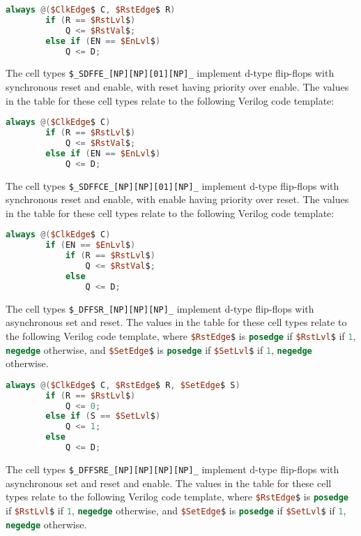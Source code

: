 \begin{lstlisting}[mathescape,language=Verilog]
	always @($ClkEdge$ C, $RstEdge$ R)
		if (R == $RstLvl$)
			Q <= $RstVal$;
		else if (EN == $EnLvl$)
			Q <= D;
\end{lstlisting}

The cell types {\tt \$\_SDFFE\_[NP][NP][01][NP]\_} implement d-type flip-flops
with synchronous reset and enable, with reset having priority over enable.
The values in the table for these cell types relate to the
following Verilog code template:

\begin{lstlisting}[mathescape,language=Verilog]
	always @($ClkEdge$ C)
		if (R == $RstLvl$)
			Q <= $RstVal$;
		else if (EN == $EnLvl$)
			Q <= D;
\end{lstlisting}

The cell types {\tt \$\_SDFFCE\_[NP][NP][01][NP]\_} implement d-type flip-flops
with synchronous reset and enable, with enable having priority over reset.
The values in the table for these cell types relate to the
following Verilog code template:

\begin{lstlisting}[mathescape,language=Verilog]
	always @($ClkEdge$ C)
		if (EN == $EnLvl$)
			if (R == $RstLvl$)
				Q <= $RstVal$;
			else
				Q <= D;
\end{lstlisting}

The cell types {\tt \$\_DFFSR\_[NP][NP][NP]\_} implement
d-type flip-flops with asynchronous set and reset. The values in the table for these cell types relate to the
following Verilog code template, where \lstinline[mathescape,language=Verilog];$RstEdge$; is \lstinline[language=Verilog];posedge;
if \lstinline[mathescape,language=Verilog];$RstLvl$; if \lstinline[language=Verilog];1;, \lstinline[language=Verilog];negedge;
otherwise, and \lstinline[mathescape,language=Verilog];$SetEdge$; is \lstinline[language=Verilog];posedge;
if \lstinline[mathescape,language=Verilog];$SetLvl$; if \lstinline[language=Verilog];1;, \lstinline[language=Verilog];negedge;
otherwise.

\begin{lstlisting}[mathescape,language=Verilog]
	always @($ClkEdge$ C, $RstEdge$ R, $SetEdge$ S)
		if (R == $RstLvl$)
			Q <= 0;
		else if (S == $SetLvl$)
			Q <= 1;
		else
			Q <= D;
\end{lstlisting}

The cell types {\tt \$\_DFFSRE\_[NP][NP][NP][NP]\_} implement
d-type flip-flops with asynchronous set and reset and enable. The values in the table for these cell types relate to the
following Verilog code template, where \lstinline[mathescape,language=Verilog];$RstEdge$; is \lstinline[language=Verilog];posedge;
if \lstinline[mathescape,language=Verilog];$RstLvl$; if \lstinline[language=Verilog];1;, \lstinline[language=Verilog];negedge;
otherwise, and \lstinline[mathescape,language=Verilog];$SetEdge$; is \lstinline[language=Verilog];posedge;
if \lstinline[mathescape,language=Verilog];$SetLvl$; if \lstinline[language=Verilog];1;, \lstinline[language=Verilog];negedge;
otherwise.

